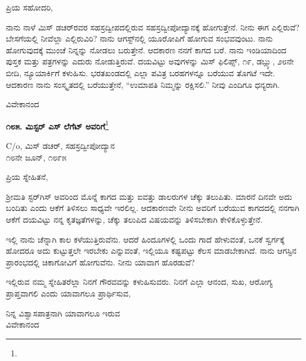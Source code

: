 \vspace{-0.5cm}

\noindent
ಪ್ರಿಯ ಸಹೋದರಿ,

ನಾನು ನಾಳೆ ಮಿಸ್‌ ಡಚರ್‌ರವರ ಸಹಸ್ರದ್ವೀಪದಲ್ಲಿರುವ ಸಹಸ್ರದ್ವೀಪೋದ್ಯಾನಕ್ಕೆ ಹೋಗುತ್ತೇನೆ. ನೀನು ಈಗ ಎಲ್ಲಿರುವೆ? ಬೇಸಗೆಯಲ್ಲಿ ನೀವೆಲ್ಲಾ ಎಲ್ಲಿರುವಿರಿ? ನಾನು ಆಗಸ್ಟ್‌ನಲ್ಲಿ ಯೂರೋಪಿಗೆ ಹೋಗುವ ಸಂಭವವುಂಟು. ನಾನು ಹೋಗುವುದಕ್ಕೆ ಮುಂಚೆ ನಿನ್ನನ್ನು ನೋಡಲು ಬರುತ್ತೇನೆ. ಆದಕಾರಣ ನನಗೆ ಕಾಗದ ಬರೆ. ನಾನು ಇಂಡಿಯಾದಿಂದ ಪುಸ್ತಕ ಮತ್ತು ಪತ್ರಗಳನ್ನು ಎದುರು ನೋಡುತ್ತಿರುವೆ. ದಯವಿಟ್ಟು ಅವುಗಳನ್ನು  ಮಿಸ್ ಫಿಲಿಪ್ಸ್, ೧೯, ಡಬ್ಲ್ಯು, ೨೮ನೇ ಬೀದಿ, ನ್ಯೂಯಾರ್ಕಿಗೆ ಕಳುಹಿಸು. ಭರತಖಂಡದಲ್ಲಿ ಎಲ್ಲಾ ಪವಿತ್ರ ಬರಹಗಳನ್ನೂ ಬರೆಯುವ ತೊಗಟೆ ಇದೇ. ಆದಕಾರಣ ನಾನು ಸಂಸ್ಕೃತದಲ್ಲಿ ಬರೆಯುತ್ತೇನೆ, “ಉಮಾಪತಿ ನಿಮ್ಮನ್ನು ರಕ್ಷಿಸಲಿ.” ನೀವು ಎಂದಿಗೂ ಧನ್ಯರಾಗಿ.
\vspace{-0.6cm}

{\flushright
ವಿವೇಕಾನಂದ\par}
\vspace{-0.4cm}

\begin{center}
\textbf{೧೮೫. ಮಿಸ್ಟರ್ ಎಸ್ ಲೆಗೆಟ್ ಅವರಿಗೆ}\footnote{}
\end{center}

\vspace{-0.4cm}

\begin{flushright}
C/o, ಮಿಸ್‌ ಡಚರ್‌, ಸಹಸ್ರದ್ವೀಪೋದ್ಯಾನ\\೧೮ನೇ ಜೂನ್, ೧೮೯೫
\end{flushright}

\vspace{-0.5cm}

\noindent
ಪ್ರಿಯ ಸ್ನೇಹಿತನೆ,

ಶ‍್ರೀಮತಿ ಸ್ಟರ್‌ಗಿಸ್ ಅವರಿಂದ ಮೊನ್ನೆ ಕಾಗದ ಮತ್ತು ಐವತ್ತು ಡಾಲರುಗಳ ಚೆಕ್ಕು ತಲುಪಿತು. ಮಾರನೆ ದಿನವೇ ಅದು ಬಂದಿತು ಎಂದು ಆಕೆಗೆ ತಿಳಿಸಲು ಸಾಧ್ಯವೇ ಇರಲಿಲ್ಲ. ಆದಕಾರಣವೇ ನೀನು ಅವರಿಗೆ ಬರೆಯುವ ಕಾಗದದಲ್ಲಿ ನನಗಾಗಿ ಆಕೆಗೆ ದಯವಿಟ್ಟು ನನ್ನ ಕೃತಜ್ಞತೆಗಳನ್ನು, ಚೆಕ್ಕು ತಲುಪಿದ ವಿಷಯವನ್ನು ತಿಳಿಸಬೇಕಾಗಿ ಕೇಳಿಕೊಳ್ಳುತ್ತೇನೆ.

ಇಲ್ಲಿ ನಾನು ಚೆನ್ನಾಗಿ ಕಾಲ ಕಳೆಯುತ್ತಿರುವೆನು. ಆದರೆ ಹಿಂದೂಗಳಲ್ಲಿ ಒಂದು ಗಾದೆ ಹೇಳುವಂತೆ, ಒನಕೆ ಸ್ವರ್ಗಕ್ಕೆ ಹೋದರೂ ಅದು ಕುಟ್ಟುತ್ತಲೇ ಇರಬೇಕು ಎನ್ನುವಂತೆ, ಇಲ್ಲಿಯೂ ಕಷ್ಟಪಟ್ಟು ಕೆಲಸ ಮಾಡಬೇಕಾಗಿದೆ. ನಾನು ಆಗಸ್ಟಿನ ಪ್ರಾರಂಭದಲ್ಲಿ ಚಿಕಾಗೋವಿಗೆ ಹೋಗುವೆನು. ನೀನು ಯಾವಾಗ ಹೊರಡುವೆ?

ಇಲ್ಲಿರುವ ನಮ್ಮ ಸ್ನೇಹಿತರೆಲ್ಲಾ ನಿನಗೆ ಗೌರವವನ್ನು ಕಳುಹಿಸುವರು. ನಿನಗೆ ಎಲ್ಲಾ ಆನಂದ, ಸುಖ, ಆರೋಗ್ಯ ಪ್ರಾಪ್ತವಾಗಲಿ ಎಂದು ಯಾವಾಗಲೂ ಪ್ರಾರ್ಥಿಸುವ,

{\flushright
ನಿನ್ನ ವಿಶ್ವಾಸಪಾತ್ರನಾಗಿ ಯಾವಾಗಲೂ ಇರುವ\\ವಿವೇಕಾನಂದ\par}
\eject

